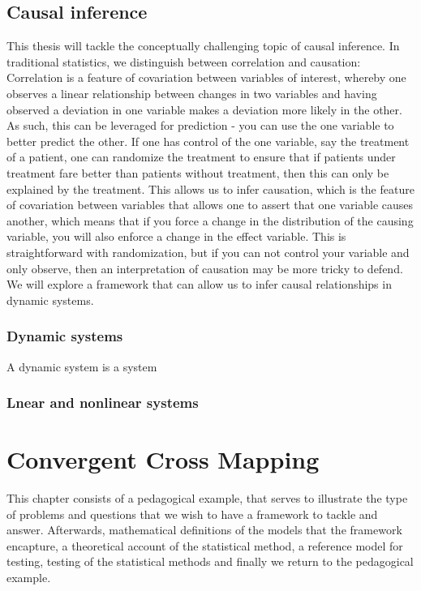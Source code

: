 \documentclass[11pt, a4paper]{memoir}
\subtitle{Convergent Cross Mapping and Alternative Approaches}
\begin{document}
\begingroup
  \selectfont
  \maketitle
\endgroup

\tableofcontents

\section{Causal inference}
This thesis will tackle the conceptually challenging topic of causal inference. In traditional statistics, we distinguish between correlation and causation: Correlation is a feature of covariation between variables of interest, whereby one observes a linear relationship between changes in two variables and having observed a deviation in one variable makes a deviation more likely in the other. As such, this can be leveraged for prediction - you can use the one variable to better predict the other. If one has control of the one variable, say the treatment of a patient, one can randomize the treatment to ensure that if patients under treatment fare better than patients without treatment, then this can only be explained by the treatment. This allows us to infer causation, which is the feature of covariation between variables that allows one to assert that one variable causes another, which means that if you force a change in the distribution of the causing variable, you will also enforce a change in the effect variable. This is straightforward with randomization, but if you can not control your variable and only observe, then an interpretation of causation may be more tricky to defend. We will explore a framework that can allow us to infer causal relationships in dynamic systems.

\subsection{Dynamic systems}
A dynamic system is a system 

\subsection{Lnear and nonlinear systems}


\chapter{Convergent Cross Mapping}
This chapter consists of a pedagogical example, that serves to illustrate the type of problems and questions that we wish to have a framework to tackle and answer. Afterwards, mathematical definitions of the models that the framework encapture, a theoretical account of the statistical method, a reference model for testing, testing of the statistical methods and finally we return to the pedagogical example.
\end{document}
